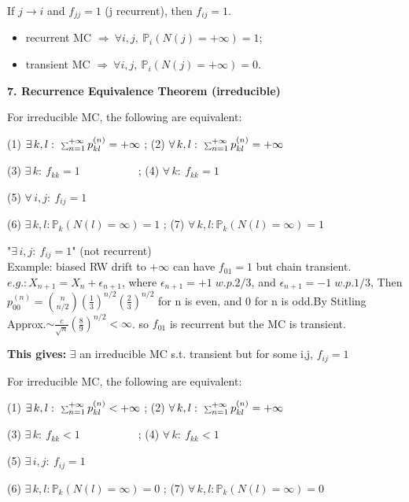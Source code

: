 \documentclass[a4paper, landscape]{article}
\newcommand{\topic}[1]{\par\medskip\textbf{#1}\par}
\newcommand{\subtopic}[1]{\par\textbf{#1}}
\newcommand{\smallsum}{\mathop{\scalebox{0.65}{$\sum$}}\nolimits}
\renewcommand{\topic}[1]{\par\medskip\noindent\colorbox{highlightcolor}{\parbox{\dimexpr\columnwidth-2\fboxsep\relax}{\textbf{#1}}}\par}
\renewcommand{\subtopic}[1]{\par\textbf{\color{blue}{#1}}} %
\begin{document}
\begin{multicols}{4}
\subtopic{$f$-lemma:}
If $j\to i$ and $f_{jj}=1$ (j recurrent), then $f_{ij}=1$.

\subtopic{Infinite returns lemma (irreducible):}
\begin{itemize}
  \item recurrent MC $\Rightarrow\ \forall i,j,\ \mathbb P_i(N(j)=+\infty)=1$;
  \item transient MC $\Rightarrow\ \forall i,j,\ \mathbb P_i(N(j)=+\infty)=0$.
\end{itemize}


\topic{7. Recurrence Equivalence Theorem (irreducible)}
\subtopic{Recurrence Equivalent:} For irreducible MC, the following are equivalent:
\par (1) $\exists\, k,l:\ \smallsum_{n=1}^{+\infty}p^{(n)}_{kl}=+\infty$
; (2) $\forall\, k,l:\ \smallsum_{n=1}^{+\infty}p^{(n)}_{kl}=+\infty$
\par (3) $\exists\, k:\ f_{kk}=1\qquad \qquad \quad \;$;  (4) $\forall\, k:\ f_{kk}=1$
\par (5) $\forall\, i,j:\ f_{ij}=1$
\par (6) $\exists\, k,l:\mathbb P_k(N(l)=\infty)=1$ ; (7) $\forall\, k,l:\mathbb P_k(N(l)=\infty)=1$

\subtopic{Non-example for:} "$\exists\, i,j:\ f_{ij}=1$" (not recurrent)\\
Example: biased RW drift to $+\infty$ can have $f_{01}=1$ but chain transient. $e.g.: X_{n+1}=X_n+\epsilon_{n+1}$, where $\epsilon_{n+1}=+1\;w.p. 2/3$, and $\epsilon_{n+1}=-1\;w.p. 1/3$, Then $p_{00}^{(n)}=\binom{n}{n/2}(\frac{1}{3})^{n/2}(\frac{2}{3})^{n/2}$ for n is even, and 0 for n is odd.By Stitling Approx.$\sim \frac{c}{\sqrt n}(\frac{8}{9})^{n/2}<\infty$. so $f_{01}$ is recurrent but the MC is transient.

\textbf{This gives:} $\exists$ an irreducible MC s.t. transient but for some i,j, $f_{ij}=1$

\subtopic{Transient Equivalent:} For irreducible MC, the following are equivalent:
\par (1) $\exists\, k,l:\ \smallsum_{n=1}^{+\infty}p^{(n)}_{kl}<+\infty$
; (2) $\forall\, k,l:\ \smallsum_{n=1}^{+\infty}p^{(n)}_{kl}=+\infty$
\par (3) $\exists\, k:\ f_{kk}<1\qquad \qquad \quad \;$;  (4) $\forall\, k:\ f_{kk}<1$
\par (5) $\exists\, i,j:\ f_{ij}=1$
\par (6) $\exists\, k,l:\mathbb P_k(N(l)=\infty)=0$ ; (7) $\forall\, k,l:\mathbb P_k(N(l)=\infty)=0$


\end{multicols}
\end{document}
